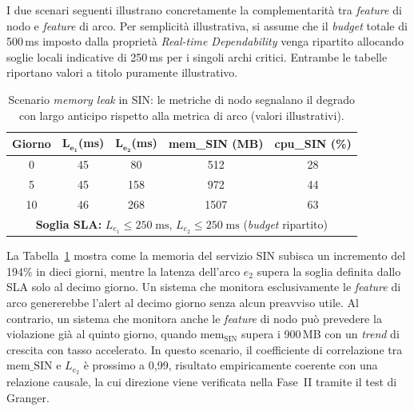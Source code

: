 I due scenari seguenti illustrano concretamente la complementarità tra \textit{feature} di nodo e
\textit{feature} di arco. Per semplicità illustrativa, si assume che il \textit{budget} totale di
500\,ms imposto dalla proprietà \emph{Real-time Dependability} venga ripartito allocando soglie
locali indicative di 250\,ms per i singoli archi critici. Entrambe le tabelle riportano valori a
titolo puramente illustrativo.

\begin{table}[htbp]
\centering
\caption{Scenario \textit{memory leak} in SIN: le metriche di nodo segnalano il degrado con
largo anticipo rispetto alla metrica di arco (valori illustrativi).}
\label{tab:scenario_memory_leak}
\begin{tabular}{ccccc}
\toprule
\textbf{Giorno} & $\boldsymbol{L_{e_1}}$\textbf{(ms)} & $\boldsymbol{L_{e_2}}$\textbf{(ms)} & \textbf{mem\_SIN (MB)} & \textbf{cpu\_SIN (\%)} \\
\midrule
0  & 45 & 80  & 512  & 28 \\
5  & 45 & 158 & 972  & 44 \\
10 & 46 & 268 & 1507 & 63 \\
\midrule
\multicolumn{5}{c}{\footnotesize\textbf{Soglia \gls{SLA}:} $L_{e_1} \leq 250\;\text{ms}$, $L_{e_2} \leq 250\;\text{ms}$ (\textit{budget} ripartito)} \\
\bottomrule
\end{tabular}
\end{table}

La Tabella~\ref{tab:scenario_memory_leak} mostra come la memoria del servizio SIN subisca un
incremento del 194\% in dieci giorni, mentre la latenza dell'arco $e_2$ supera la soglia definita
dallo \gls{SLA} solo al decimo giorno. Un sistema che monitora esclusivamente le \textit{feature}
di arco genererebbe l'alert al decimo giorno senza alcun preavviso utile. Al contrario, un sistema
che monitora anche le \textit{feature} di nodo può prevedere la violazione già al quinto giorno,
quando $\text{mem}_{\text{SIN}}$ supera i 900\,MB con un \textit{trend} di crescita con tasso
accelerato. In questo scenario, il coefficiente di correlazione tra $\text{mem\_SIN}$ e $L_{e_2}$
è prossimo a 0,99, risultato empiricamente coerente con una relazione causale, la cui direzione
viene verificata nella Fase~II tramite il test di Granger.

